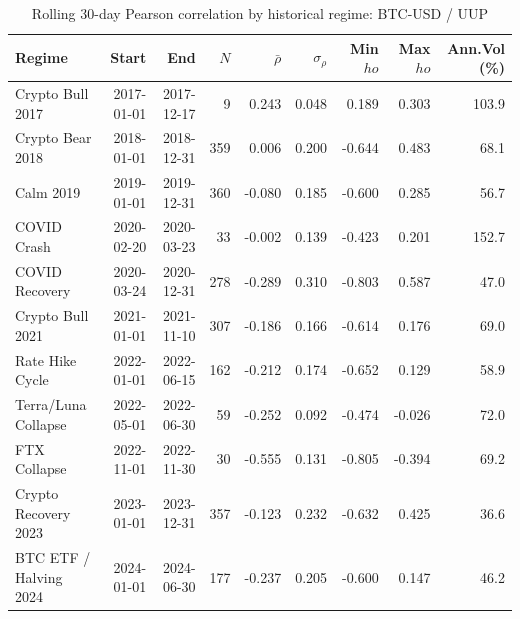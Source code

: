 \begin{table}[H]
\centering
\small
\caption{Rolling 30-day Pearson correlation by historical regime: BTC-USD / UUP}
\label{tab:regime_corr_BTCUSDUUP}
\begin{tabular}{lrrrrrrrr}
\toprule
Regime & Start & End & $N$ & $\bar{\rho}$ & $\sigma_\rho$ & Min $
ho$ & Max $
ho$ & Ann.Vol (\%) \\
\midrule
Crypto Bull 2017 & 2017-01-01 & 2017-12-17 & 9 & 0.243 & 0.048 & 0.189 & 0.303 & 103.9 \\
Crypto Bear 2018 & 2018-01-01 & 2018-12-31 & 359 & 0.006 & 0.200 & -0.644 & 0.483 & 68.1 \\
Calm 2019 & 2019-01-01 & 2019-12-31 & 360 & -0.080 & 0.185 & -0.600 & 0.285 & 56.7 \\
COVID Crash & 2020-02-20 & 2020-03-23 & 33 & -0.002 & 0.139 & -0.423 & 0.201 & 152.7 \\
COVID Recovery & 2020-03-24 & 2020-12-31 & 278 & -0.289 & 0.310 & -0.803 & 0.587 & 47.0 \\
Crypto Bull 2021 & 2021-01-01 & 2021-11-10 & 307 & -0.186 & 0.166 & -0.614 & 0.176 & 69.0 \\
Rate Hike Cycle & 2022-01-01 & 2022-06-15 & 162 & -0.212 & 0.174 & -0.652 & 0.129 & 58.9 \\
Terra/Luna Collapse & 2022-05-01 & 2022-06-30 & 59 & -0.252 & 0.092 & -0.474 & -0.026 & 72.0 \\
FTX Collapse & 2022-11-01 & 2022-11-30 & 30 & -0.555 & 0.131 & -0.805 & -0.394 & 69.2 \\
Crypto Recovery 2023 & 2023-01-01 & 2023-12-31 & 357 & -0.123 & 0.232 & -0.632 & 0.425 & 36.6 \\
BTC ETF / Halving 2024 & 2024-01-01 & 2024-06-30 & 177 & -0.237 & 0.205 & -0.600 & 0.147 & 46.2 \\
\bottomrule
\end{tabular}
\end{table}